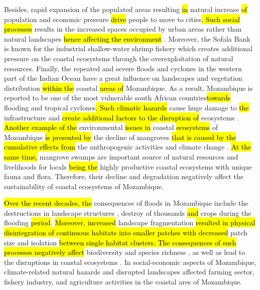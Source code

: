 \documentclass[coasts,article,submit,pdftex,moreauthors]{Definitions/mdpi}
\begin{document}
Besides, rapid expansion of the populated areas resulting \hl{in} natural increase \hl{of} population and economic pressure \hl{drive} people to move to cities\hl{. Such social processes }results in the increased spaces occupied by urban areas rather than natural landscapes \hl{hence affecting the environment }\cite{JOKARARSANJANI201838}. Moreover, the Sofala Bank is known for the industrial shallow-water shrimp fishery \cite{SOUSA2006207,MIGUEL2003365,GAMMELSROD199291} which creates additional pressure on the coastal ecosystems through the overexploitation of natural resources. Finally, the repeated and severe floods and cyclones in the western part of the Indian Ocean have a great influence on\hl{ }landscapes and vegetation distribution \hl{within the} coastal \hl{areas of }Mozambique. As a result, Mozambique is reported to be one of the most vulnerable south African countries\hl{towards} flooding and tropical cyclones\hl{. Such climatic hazards }cause huge damage to \hl{the }infrastructure and \hl{create additional factors to the disruption of }ecosystems \cite{NHANGUMBE2023101015,SALVUCCI2020106713,Gall}. \hl{Another example of the }environmental \hl{issues in} coastal \hl{ecosystems} of Mozambique \hl{is presented by }the decline of mangroves \hl{that is caused by the cumulative effects from }the anthropogenic activities and climate change \cite{COME2023106813}. \hl{At the same time, }mangrove swamps are important source of natural resources and livelihoods for locals \hl{being the} highly productive coastal ecosystems with unique fauna and flora. Therefore, their decline and degradation negatively affect the sustainability of coastal ecosystems of Mozambique.

\hl{Over the recent decades, the }consequences of floods in Mozambique include the destructions in landscape structures \cite{FICHTNER2023103329}, destroy of thousands \hl{and} crops during the flooding \hl{period}\cite{BOFANA2022112808}. \hl{Moreover, increased }landscape fragmentation \hl{resulted in physical disintegration of continuous habitats into smaller patches with decreased }patch size and isolation \hl{between single habitat clusters. The consequences of such processes negatively affect }biodiversity and species richness \cite{Guldemond}, as well as lead to the disruptions in coastal ecosystems \cite{RAMAYANTI20221025}. In social-economic aspects of Mozambique, climate-related natural hazards and disrupted landscapes affected farming sector, fishery industry, and agriculture activities in the coastal ares of Mozambique. 
\end{document}
